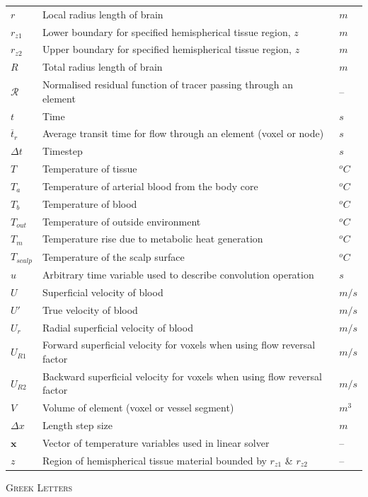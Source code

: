 \documentclass[11pt,english,a4paper,twoside,openright]{report}
\begin{document}
{{{\begin{center}
\begin{longtable}[H]{L{0.1\textwidth} L{0.50\textwidth} R{0.15\textwidth}}
		$r$ & Local radius length of brain & $m$ \\
		$r_{z1}$ & Lower boundary for specified hemispherical tissue region, $z$ & $m$ \\
		$r_{z2}$ & Upper boundary for specified hemispherical tissue region, $z$ & $m$ \\
		$R$ & Total radius length of brain & $m$ \\
		$\mathcal{R}$ & Normalised residual function of tracer passing through an element & -- \\
		$t$ & Time & $s$ \\
		$\overline{t}_{r}$ & Average transit time for flow through an element (voxel or node) & $s$ \\
		$\Delta t$ & Timestep & $s$ \\
		$T$ & Temperature of tissue & $^{o}C$ \\
		$T_{a}$ & Temperature of arterial blood from the body core & $^{o}C$ \\
		$T_{b}$ & Temperature of blood & $^{o}C$ \\
		$T_{out}$ & Temperature of outside environment & $^{o}C$ \\
		$T_{m}$ & Temperature rise due to metabolic heat generation & $^{o}C$ \\
		$T_{scalp}$ & Temperature of the scalp surface & $^{o}C$ \\
		$u$ & Arbitrary time variable used to describe convolution operation & $s$ \\
		$U$ & Superficial 
		velocity of blood & $m/s$ \\
		$U'$ & True 
		velocity of blood & $m/s$ \\
		$U_{r}$ & Radial superficial velocity of blood & $m/s$ \\
		$U_{R1}$ & Forward superficial velocity for voxels when using flow reversal factor & $m/s$ \\
		$U_{R2}$ & Backward superficial velocity for voxels when using flow reversal factor & $m/s$ \\
		$V$ & Volume of element (voxel or vessel segment) & $m^3$\\
		$\Delta x$ & Length step size & $m$ \\
		$\mathbf{x}$ & Vector of temperature variables used in linear solver & -- \\
		$z$ & Region of hemispherical tissue material bounded by $r_{z1}$ \& $r_{z2}$ & -- \\
		
	\end{longtable}
	\end{center}
	\pagebreak
	{\selectfont\textsc{Greek Letters}
		\vspace*{-\baselineskip}
		\begin{center}
		\begin{longtable}[H]{L{0.1\textwidth} L{0.50\textwidth} R{0.15\textwidth}}
			

\end{longtable}
\end{center}}}}}
\end{document}
